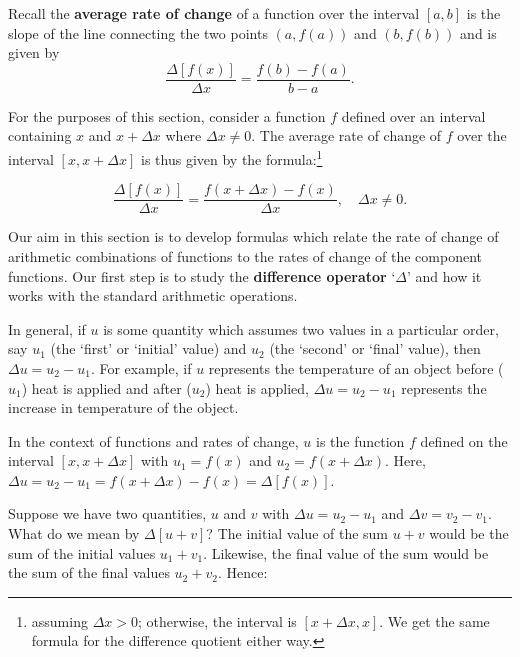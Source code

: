 \documentclass{ximera}
\begin{document}
Recall the \textbf{average rate of change} of a function over the interval $[a,b]$  is the slope of the line connecting the two points $(a, f(a))$ and $(b, f(b))$ and is given by \[ \frac{\Delta[f(x)]}{\Delta x} = \frac{f(b)-f(a)}{b-a}.\]



For the purposes of this section, consider a function $f$ defined over an interval containing $x$ and $x+\Delta x$ where $\Delta x \neq 0$. The average rate of change of $f$ over the interval $[x,x+\Delta x]$ is thus given by the formula:\footnote{assuming $\Delta x>0$;  otherwise, the interval is $[x+\Delta x, x]$.  We get the same formula for the difference quotient either way.}

\[ \frac{\Delta[f(x)]}{\Delta x} = \frac{f(x+\Delta x)-f(x)}{\Delta x}, \quad \Delta x \neq 0.\]

Our aim in this section is to develop formulas which relate the rate of change of arithmetic combinations of functions to the rates of change of the component functions.   Our first step is to study the \textbf{difference operator}  `$\Delta$'  and how it works with the standard arithmetic operations.  

In general, if $u$ is some quantity which assumes two values in a particular order, say $u_{1}$ (the `first' or `initial' value) and $u_{2}$ (the `second' or `final' value), then $\Delta u = u_{2} - u_{1}$.  For example, if $u$ represents the temperature of an object before ($u_{1}$) heat is applied and after ($u_{2}$) heat is applied,  $\Delta u = u_{2} - u_{1}$ represents the increase in temperature of the object.

 In the context of functions and rates of change, $u$ is the function $f$ defined on the interval $[x, x + \Delta x]$ with $u_{1} = f(x)$ and $u_{2} = f(x+\Delta x)$.  Here, $\Delta u = u_{2} - u_{1} = f(x+\Delta x) - f(x) = \Delta[f(x)]$.  

Suppose we have two quantities, $u$ and $v$ with $\Delta u = u_{2} - u_{1}$ and $\Delta v = v_{2} - v_{1}$.   What do we mean by   $\Delta[u+v]$?  The initial value of the sum $u+v$ would be the sum of the initial values $u_{1} + v_{1}$. Likewise, the final value of the sum would be the sum of the final values $u_{2} + v_{2}$.  Hence:
 
\end{document}
